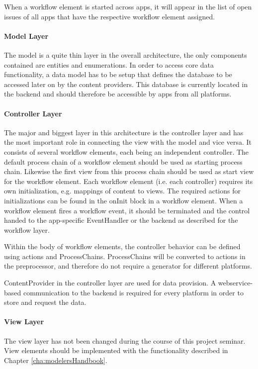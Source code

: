 When a workflow element is started across apps, it will appear in the list of open issues of all apps that have the respective workflow element assigned.

\paragraph*{Model Layer}
The model is a quite thin layer in the overall architecture, the only components contained are entities and enumerations. In order to access core data functionality, a data model has to be setup that defines the database to be accessed later on by the content providers. This database is currently located in the backend and should therefore be accessible by apps from all platforms. 

\paragraph*{Controller Layer}
The major and biggest layer in this architecture is the controller layer and has the most important role in connecting the view with the model and vice versa. It consists of several workflow elements, each being an independent controller. The default process chain of a workflow element should be used as starting process chain. Likewise the first view from this process chain should be used as start view for the workflow element. Each workflow element (i.e. each controller) requires its own initialization, e.g. mappings of content to views. The required actions for initializations can be found in the onInit block in a workflow element. When a workflow element fires a workflow event, it should be terminated and the control handed to the app-specific EventHandler or the backend as described for the workflow layer. 

Within the body of workflow elements, the controller behavior can be defined using actions and ProcessChains. ProcessChains will be converted to actions in the preprocessor, and therefore do not require a generator for different platforms.

ContentProvider in the controller layer are used for data provision. A webservice-based communication to the backend is required for every platform in order to store and request the data.

\paragraph*{View Layer}

The view layer has not been changed during the course of this project seminar. View elements should be implemented with the functionality described in Chapter \ref{cha:modelersHandbook}. 